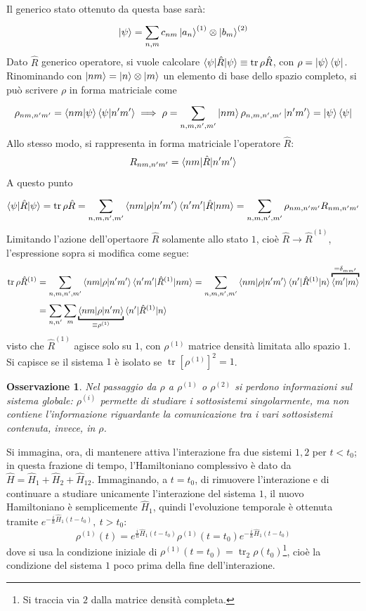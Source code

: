 \documentclass[11pt, a4paper]{scrartcl} %
\numberwithin{equation}{subsection}
\theoremstyle{style2}
\newtheorem{osservazione}{Osservazione}[section]
\theoremstyle{style1}
\begin{document}
Il generico stato ottenuto da questa base sar\`a:
\[
\ket{\psi } = \sum_{n,m}^{} c_{nm} \ket{a_n} ^{(1)} \otimes \ket{b_m} ^{(2)} 
\] 
Dato $\hat{R}$ generico operatore, si vuole calcolare $\braket{\psi |\hat{R}|\psi } \equiv \operatorname{tr} \rho \hat{R}$, con $\rho  = \ket{\psi } \bra{\psi } $.
Rinominando con $\ket{nm} = \ket{n} \otimes \ket{m}$ un elemento di base dello spazio completo, si pu\`o scrivere $\rho $ in forma matriciale come
\[
\rho _{nm,n'm'} = \braket{nm|\psi } \braket{\psi |n'm'} \implies \rho  = \sum_{n,m,n',m'}^{} \ket{nm} \rho _{n,m,n',m'} \ket{n'm'} = \ket{\psi } \bra{\psi }  
\] 
Allo stesso modo, si rappresenta in forma matriciale l'operatore $\hat{R}$:
\[
R_{nm,n'm'} = \braket{nm|\hat{R}|n'm'} 
\] 
A questo punto
\[
\braket{\psi |\hat{R}|\psi } = \operatorname{tr} \rho \hat{R} = \sum_{n,m,n',m'}^{} \braket{nm|\rho |n'm'} \braket{n'm'|\hat{R}|nm} =\sum_{n,m,n',m'}^{} \rho _{nm,n'm'} R_{nm,n'm'} 
\] 
Limitando l'azione dell'opertaore $\hat{R}$ solamente allo stato $1$, cio\`e $\hat{R}\to \hat{R}^{(1)} $, l'espressione sopra si modifica come segue:
\[
\begin{split}
	\operatorname{tr} \rho  \hat{R}^{(1)} &=\sum_{n,m,n',m'}^{} \braket{nm|\rho |n'm'} \braket{n'm'|\hat{R}^{(1)} |nm} = \sum_{n,m,n',m'}^{} \braket{nm|\rho |n'm'} \braket{n'|\hat{R}^{(1)} |n} \overbracket{\braket{m'|m}}^{= \delta _{mm'} } \\
					      &=\sum_{n,n'}^{} \sum_{m}^{} \underbracket{\braket{nm|\rho |n'm}}_{\equiv \rho ^{(1)} }  \braket{n'|\hat{R}^{(1)} |n} 
\end{split}
\] 
visto che $\hat{R}^{(1)} $ agisce solo su $1$, con $\rho ^{(1)} $ matrice densit\`a limitata allo spazio $1$. 
Si capisce se il sistema $1$ \`e isolato se $\operatorname{tr} \left[ \rho^{(1)} \right] ^2 = 1  $.
\begin{osservazione}
	Nel passaggio da  $\rho $ a $\rho ^{(1)} $ o $\rho ^{(2)} $ si perdono informazioni sul sistema globale: $\rho ^{(i)} $ permette di studiare i sottosistemi singolarmente, ma non contiene l'informazione riguardante la comunicazione tra i vari sottosistemi contenuta, invece, in $\rho $.
\end{osservazione}
Si immagina, ora, di mantenere attiva l'interazione fra due sistemi $1,2$ per $t<t_0$; in questa frazione di tempo, l'Hamiltoniano complessivo \`e dato da $\hat{H}= \hat{H}_1 + \hat{H}_2 + \hat{H}_{12} $.
Immaginando, a $t =t_0$, di rimuovere l'interazione e di continuare a studiare unicamente l'interazione del sistema $1$, il nuovo Hamiltoniano \`e semplicemente $\hat{H}_1$, quindi l'evoluzione temporale \`e ottenuta tramite $e^{-\frac{i}{\hbar }\hat{H}_1 (t-t_0)} , \ t>t_0$:
\begin{equation}
\rho ^{(1)} (t) = e^{\frac{i}{\hbar }\hat{H}_1 (t-t_0)}  \rho ^{(1)} (t=t_0) e^{-\frac{i}{\hbar }\hat{H}_1 (t-t_0)} 
\end{equation}
dove si usa la condizione iniziale di $\rho^{(1)} (t=t_0) = \operatorname{tr} _{2} \rho (t_0) $\footnote{Si traccia via $2$ dalla matrice densit\`a completa.}, cio\`e la condizione del sistema $1$ poco prima della fine dell'interazione.
\end{document}
